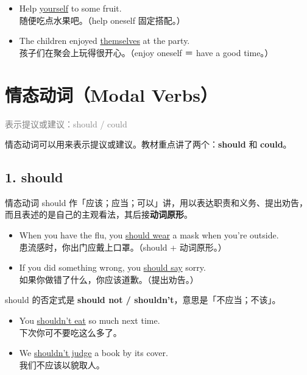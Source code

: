 \documentclass[11pt,a4paper]{ctexart}
\begin{document}
\begin{center}\end{center}

\begin{itemize}[leftmargin=1.4em]
\item Help \underline{yourself} to some fruit.\\ 随便吃点水果吧。（help oneself 固定搭配。）
\item The children enjoyed \underline{themselves} at the party.\\ 孩子们在聚会上玩得很开心。（enjoy oneself ＝ have a good time。）
\end{itemize}

\section{情态动词（Modal Verbs）}
\noindent\textcolor{gray}{表示提议或建议：should / could}\par\smallskip
情态动词可以用来表示提议或建议。教材重点讲了两个：\textbf{should} 和 \textbf{could}。

\subsection*{1. should}

情态动词 should 作「应该；应当；可以」讲，用以表达职责和义务、提出劝告，而且表述的是自己的主观看法，其后接\textbf{动词原形}。

\begin{itemize}[leftmargin=1.4em]
\item When you have the flu, you \underline{should wear} a mask when you’re outside.\\ 患流感时，你出门应戴上口罩。（should + 动词原形。）
\item If you did something wrong, you \underline{should say} sorry.\\ 如果你做错了什么，你应该道歉。（提出劝告。）
\end{itemize}

should 的否定式是 \textbf{should not / shouldn’t}，意思是「不应当；不该」。

\begin{itemize}[leftmargin=1.4em]
\item You \underline{shouldn’t eat} so much next time.\\ 下次你可不要吃这么多了。
\item We \underline{shouldn’t judge} a book by its cover.\\ 我们不应该以貌取人。
\end{itemize}
\end{document}
